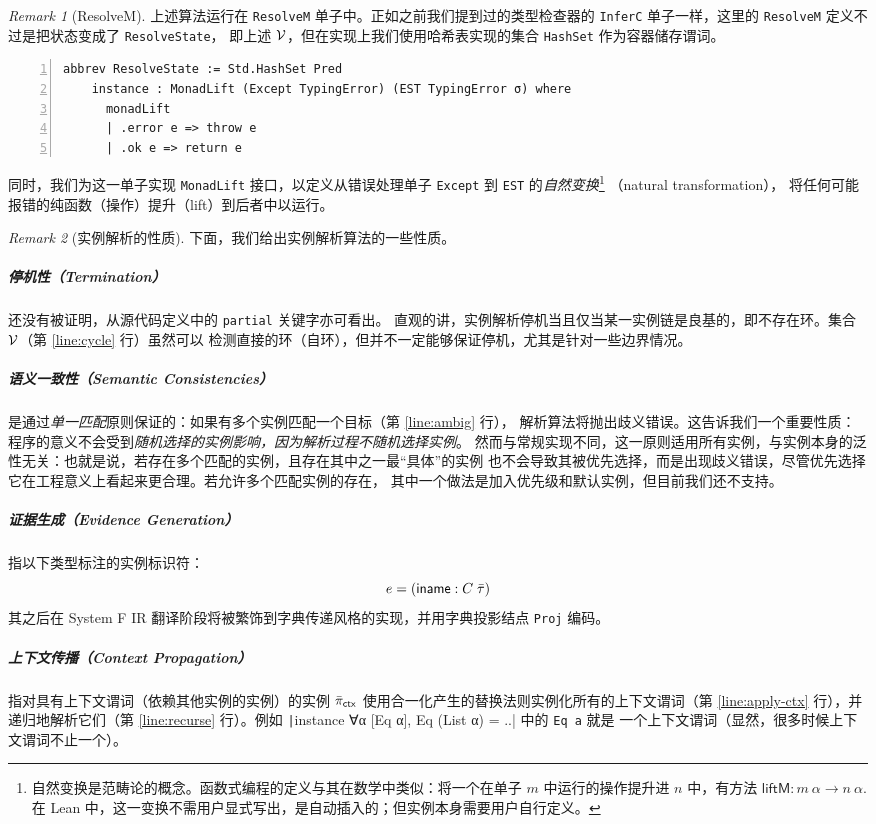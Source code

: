 \documentclass[a4paper, 11pt]{article}
\theoremstyle{remark}\newtheorem*{remark}{Remark}
\theoremstyle{definition}\newtheorem*{definition}{Definition}
\begin{document}
\begin{remark}[\textsf{ResolveM}]
  上述算法运行在 \texttt{ResolveM} 单子中。正如之前我们提到过的类型检查器的 \texttt{InferC}
  单子一样，这里的 \texttt{ResolveM} 定义不过是把状态变成了 \texttt{ResolveState}，
  即上述 $\mathcal{V}$，但在实现上我们使用哈希表实现的集合 \texttt{HashSet} 作为容器储存谓词。
  \begin{Verbatim}[numbers=left]
    abbrev ResolveState := Std.HashSet Pred
    instance : MonadLift (Except TypingError) (EST TypingError σ) where
      monadLift
      | .error e => throw e
      | .ok e => return e
  \end{Verbatim}
  同时，我们为这一单子实现 \texttt{MonadLift} 接口，以定义从错误处理单子 \texttt{Except} 到 \texttt{EST} 的\emph{自然变换}\footnote{
    自然变换是范畴论的概念。函数式编程的定义与其在数学中类似：将一个在单子 $m$ 中运行的操作提升进 $n$ 中，有方法
    $\mathsf{liftM} : m\ \alpha\to n\ \alpha$. 在 Lean 中，这一变换不需用户显式写出，是自动插入的；但实例本身需要用户自行定义。
  }
  （natural transformation），
  将任何可能报错的纯函数（操作）提升（lift）到后者中以运行。

\end{remark}

\begin{remark}[实例解析的性质]
  下面，我们给出实例解析算法的一些性质。
  \subparagraph{停机性（Termination）} 还没有被证明，从源代码定义中的 \texttt{partial} 关键字亦可看出。
  直观的讲，实例解析停机当且仅当某一实例链是良基的，即不存在环。集合 $\mathcal{V}$（第 \ref{line:cycle} 行）虽然可以
  检测直接的环（自环），但并不一定能够保证停机，尤其是针对一些边界情况。
  \subparagraph{语义一致性（Semantic Consistencies）} 是通过\emph{单一匹配}原则保证的：如果有多个实例匹配一个目标（第 \ref{line:ambig} 行），
  解析算法将抛出歧义错误。这告诉我们一个重要性质：程序的意义不会受到\emph{随机选择的实例影响，因为解析过程不随机选择实例}。
  然而与常规实现不同，这一原则适用所有实例，与实例本身的泛性无关：也就是说，若存在多个匹配的实例，且存在其中之一最“具体”的实例
  也不会导致其被优先选择，而是出现歧义错误，尽管优先选择它在工程意义上看起来更合理。若允许多个匹配实例的存在，
  其中一个做法是加入优先级和默认实例，但目前我们还不支持。
  \subparagraph{证据生成（Evidence Generation）} 指以下类型标注的实例标识符：
  \[
    e = (\mathsf{iname} : C\;\bar{\tau})
  \]
  其之后在 System F IR 翻译阶段将被繁饰到字典传递风格的实现，并用字典投影结点 \texttt{Proj} 编码。
  \subparagraph{上下文传播（Context Propagation）} 指对具有上下文谓词（依赖其他实例的实例）的实例 $\bar{\pi}_{\mathsf{ctx}}$
  使用合一化产生的替换法则实例化所有的上下文谓词（第 \ref{line:apply-ctx} 行），并
  递归地解析它们（第 \ref{line:recurse} 行）。例如
  \texttt|instance ∀α [Eq α], Eq (List α) = ..| 中的 \texttt{Eq a} 就是
  一个上下文谓词（显然，很多时候上下文谓词不止一个）。
\end{remark}
\end{document}
